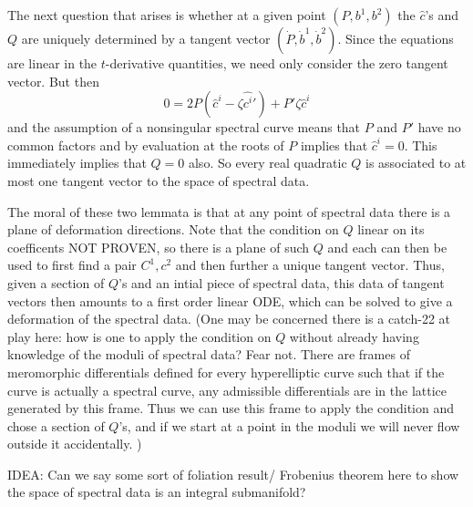 The next question that arises is whether at a given point $(P,b^1,b^2)$ the $\hat c$'s and $Q$ are uniquely determined by a tangent vector $(\dot P, \dot b^1, \dot b^2)$. Since the equations are linear in the $t$-derivative quantities, we need only consider the zero tangent vector. But then
\[
0 = 2P\left( \hat c^i - \zeta\hat {c^i}'\right) + P'\zeta\hat c^i
\]
and the assumption of a nonsingular spectral curve means that $P$ and $P'$ have no common factors and by evaluation at the roots of $P$ implies that $\hat c^i=0$. This immediately implies that $Q=0$ also. So every real quadratic $Q$ is associated to at most one tangent vector to the space of spectral data.

The moral of these two lemmata is that at any point of spectral data there is a plane of deformation directions. Note that the condition on $Q$ linear on its coefficents NOT PROVEN, so there is a plane of such $Q$ and each can then be used to first find a pair $C^1,c^2$ and then further a unique tangent vector. Thus, given a section of $Q$'s and an intial piece of spectral data, this data of tangent vectors then amounts to a first order linear ODE, which can be solved to give a deformation of the spectral data. (One may be concerned there is a catch-22 at play here: how is one to apply the condition on $Q$ without already having knowledge of the moduli of spectral data? Fear not. There are frames of meromorphic differentials defined for every hyperelliptic curve such that if the curve is actually a spectral curve, any admissible differentials are in the lattice generated by this frame. Thus we can use this frame to apply the condition and chose a section of $Q$'s, and if we start at a point in the moduli we will never flow outside it accidentally. )

IDEA: Can we say some sort of foliation result/ Frobenius theorem here to show the space of spectral data is an integral submanifold? 











